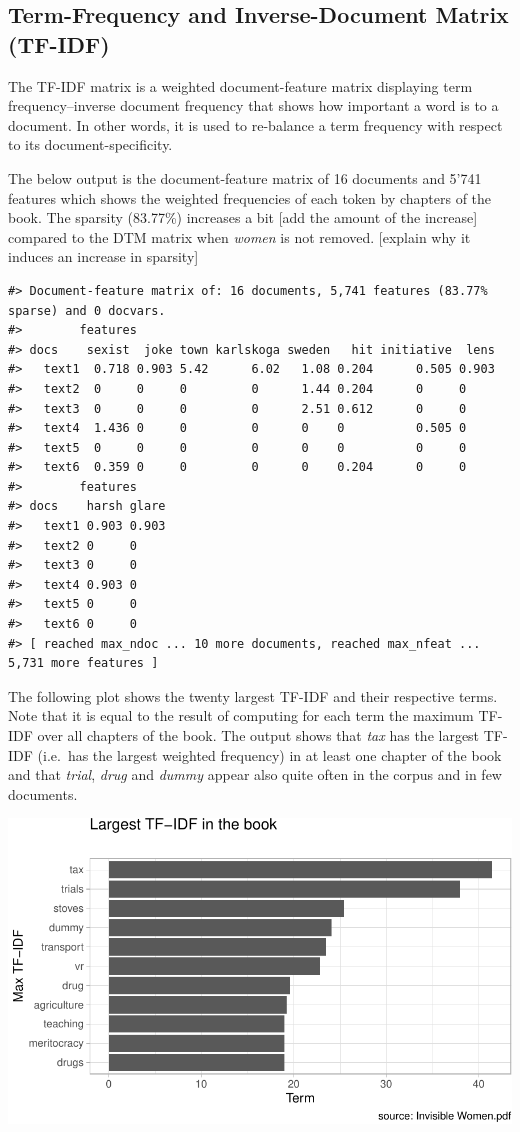 \documentclass[
]{article}
\begin{document}
\hypertarget{term-frequency-and-inverse-document-matrix-tf-idf}{%
\subsection{Term-Frequency and Inverse-Document Matrix
(TF-IDF)}\label{term-frequency-and-inverse-document-matrix-tf-idf}}

The TF-IDF matrix is a weighted document-feature matrix displaying term
frequency--inverse document frequency that shows how important a word is
to a document. In other words, it is used to re-balance a term frequency
with respect to its document-specificity.

The below output is the document-feature matrix of 16 documents and
5'741 features which shows the weighted frequencies of each token by
chapters of the book. The sparsity (83.77\%) increases a bit {[}add the
amount of the increase{]} compared to the DTM matrix when \emph{women}
is not removed. {[}explain why it induces an increase in sparsity{]}

\begin{verbatim}
#> Document-feature matrix of: 16 documents, 5,741 features (83.77% sparse) and 0 docvars.
#>        features
#> docs    sexist  joke town karlskoga sweden   hit initiative  lens
#>   text1  0.718 0.903 5.42      6.02   1.08 0.204      0.505 0.903
#>   text2  0     0     0         0      1.44 0.204      0     0    
#>   text3  0     0     0         0      2.51 0.612      0     0    
#>   text4  1.436 0     0         0      0    0          0.505 0    
#>   text5  0     0     0         0      0    0          0     0    
#>   text6  0.359 0     0         0      0    0.204      0     0    
#>        features
#> docs    harsh glare
#>   text1 0.903 0.903
#>   text2 0     0    
#>   text3 0     0    
#>   text4 0.903 0    
#>   text5 0     0    
#>   text6 0     0    
#> [ reached max_ndoc ... 10 more documents, reached max_nfeat ... 5,731 more features ]
\end{verbatim}

The following plot shows the twenty largest TF-IDF and their respective
terms. Note that it is equal to the result of computing for each term
the maximum TF-IDF over all chapters of the book. The output shows that
\emph{tax} has the largest TF-IDF (i.e.~has the largest weighted
frequency) in at least one chapter of the book and that \emph{trial},
\emph{drug} and \emph{dummy} appear also quite often in the corpus and
in few documents.

\begin{center}\includegraphics[width=0.7\linewidth]{report_files/figure-latex/max tf-idf-1} \end{center}
\end{document}
